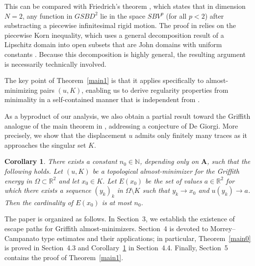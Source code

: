 \documentclass[12pt]{article}
\newtheorem{corollary}[theorem]{Corollary}
\theoremstyle{definition}
\theoremstyle{remark}
\numberwithin{equation}{section}
\newcommand{\R}{\mathbb{R}}
\newcommand{\N}{\mathbb{N}}
\newcommand{\A}{\mathbf{A}}
\begin{document}

This can be compared with Friedrich's theorem \cite[Theorem~2.1]{FriedrichPiecewise}, which states that in dimension
$N=2$,
any function in $GSBD^2$ lie in the space $SBV^p$ (for all $p < 2$)
after substracting a piecewise infinitesimal rigid motion.
The proof in \cite{FriedrichPiecewise} relies on the piecewise Korn inequality, which uses a general
decomposition result of a Lipschitz domain into open subsets that are John domains with uniform constants
\cite{friedrichJohn}. Because this decomposition is highly general, the resulting argument is necessarily technically
involved.

The key point of Theorem~\ref{main1} is that it applies specifically to almost-minimizing pairs $(u,K)$, enabling us to
derive regularity properties from minimality in a self-contained manner that is independent from \cite{FriedrichPiecewise,friedrichJohn}.
%

As a byproduct of our analysis, we also obtain a partial result toward the Griffith analogue of the main theorem in
\cite{labourieLemDegiorgi}, addressing a conjecture of De Giorgi. More precisely, we show that the displacement $u$
admits only finitely many traces as it approaches the singular set $K$.

\begin{corollary}\label{main3}
    There exists a constant $n_0\in \N$, depending only on $\A$, such that the following holds. Let $(u,K)$ be a topological almost-minimizer for
    the Griffith energy in $\Omega\subset \R^2$ and let $x_0\in K$. Let $E(x_0)$ be the set of values $a \in \R^2$ for which there
    exists a sequence $(y_k)_k$ in $\Omega \setminus K$ such that $y_k \to x_0$ and $u(y_k) \to a$.
    Then the cardinality of $E(x_0)$ is at most $n_0$.
\end{corollary}

The paper is organized as follows. In Section~3, we establish the existence of escape paths for Griffith almost-minimizers. Section~4 is devoted to Morrey--Campanato type estimates and their applications; in particular, Theorem~\ref{main0} is proved in Section~4.3 and Corollary~\ref{main3} in Section~4.4. Finally, Section~5 contains the proof of Theorem~\ref{main1}.
\end{document}
